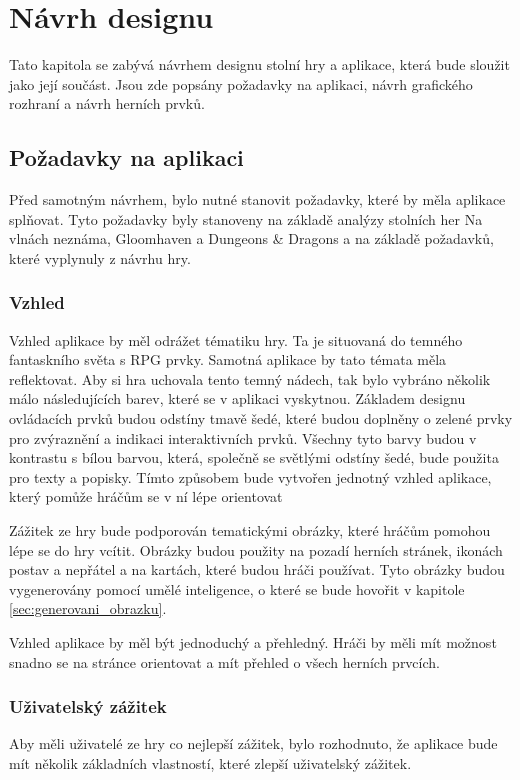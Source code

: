 \chapter{Návrh designu}
Tato kapitola se zabývá návrhem designu stolní hry a aplikace, která bude sloužit jako její součást. Jsou zde popsány požadavky na aplikaci, návrh grafického rozhraní a návrh herních prvků.

\section{Požadavky na aplikaci}
Před samotným návrhem, bylo nutné stanovit požadavky, které by měla aplikace splňovat. Tyto požadavky byly stanoveny na základě analýzy stolních her Na vlnách neznáma, Gloomhaven a Dungeons \& Dragons a na základě požadavků, které vyplynuly z návrhu hry.

\subsection{Vzhled}
Vzhled aplikace by měl odrážet tématiku hry. Ta je situovaná do temného fantaskního světa s RPG prvky. Samotná aplikace by tato témata měla reflektovat. Aby si hra uchovala tento temný nádech, tak bylo vybráno několik málo následujících barev, které se v aplikaci vyskytnou. Základem designu ovládacích prvků budou odstíny tmavě šedé, které budou doplněny o zelené prvky pro zvýraznění a indikaci interaktivních prvků. Všechny tyto barvy budou v kontrastu s bílou barvou, která, společně se světlými odstíny šedé, bude použita pro texty a popisky. Tímto způsobem bude vytvořen jednotný vzhled aplikace, který pomůže hráčům se v ní lépe orientovat

Zážitek ze hry bude podporován tematickými obrázky, které hráčům pomohou lépe se do hry vcítit. Obrázky budou použity na pozadí herních stránek, ikonách postav a nepřátel a na kartách, které budou hráči používat. Tyto obrázky budou vygenerovány pomocí umělé inteligence, o které se bude hovořit v kapitole \ref{sec:generovani_obrazku}.

Vzhled aplikace by měl být jednoduchý a přehledný. Hráči by měli mít možnost snadno se na stránce orientovat a mít přehled o všech herních prvcích.

\subsection{Uživatelský zážitek}
Aby měli uživatelé ze hry co nejlepší zážitek, bylo rozhodnuto, že aplikace bude mít několik základních vlastností, které zlepší uživatelský zážitek.

